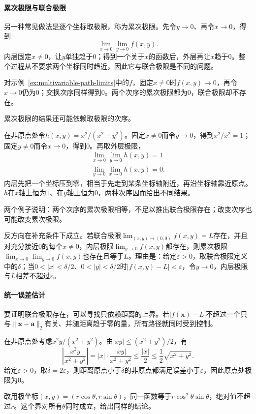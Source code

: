 \paragraph{累次极限与联合极限}
另一种常见做法是逐个坐标取极限，称为累次极限。先令$y\to0$、再令$x\to0$，得到
\[
 \lim_{x\to0}\lim_{y\to0}f(x,y).
\]
内层固定$x\neq0$，让$y$单独趋于$0$；得到一个关于$x$的函数后，外层再让$x$趋于$0$。整个过程从不要求两个坐标同时趋近，因此它与联合极限是不同的问题。

对示例~\ref{ex:multivariable-path-limits}中的$f$，固定$x\neq0$时$f(x,y)\to0$，再令$x\to0$仍为$0$；交换次序同样得到$0$。两个次序的累次极限都为$0$，联合极限却不存在。

累次极限的结果还可能依赖取极限的次序。
\begin{example}[两个次序的累次极限不相等]
\label{ex:multivariable-iterated-limits-differ}
在非原点处令$h(x,y)=x^2/(x^2+y^2)$。固定$x\neq0$而令$y\to0$，得到$x^2/x^2=1$；固定$y\neq0$而令$x\to0$，得到$0$。再取外层极限，
\[
 \begin{gathered}
\lim_{x\to0}\lim_{y\to0}h(x,y)=1\\
\lim_{y\to0}\lim_{x\to0}h(x,y)=0.
 \end{gathered}
\]
内层先把一个坐标压到零，相当于先走到某条坐标轴附近，再沿坐标轴靠近原点。$h$在$x$轴上恒为$1$、在$y$轴上恒为$0$，两种次序因而给出不同结果。
\end{example}

两个例子说明：两个次序的累次极限相等，不足以推出联合极限存在；改变次序也可能改变累次极限。

反方向在补充条件下成立。若联合极限$\lim_{(x,y)\to(0,0)}f(x,y)=L$存在，并且对充分接近$0$的每个$x\neq0$，内层极限$\lim_{y\to0}f(x,y)$都存在，则累次极限$\lim_{x\to0}\lim_{y\to0}f(x,y)$也存在且等于$L$。理由是：给定$\varepsilon>0$，取联合极限定义中的$\delta$；当$0<|x|<\delta/2$、$0<|y|<\delta/2$时$|f(x,y)-L|<\varepsilon$，令$y\to0$，内层极限与$L$相差不超过$\varepsilon$。

\paragraph{统一误差估计}
要证明联合极限存在，可以寻找只依赖距离的上界。若$|f(\bm x)-L|$不超过一个只与$\lVert\bm x-\bm a\rVert_2$有关、并随距离趋于零的量，所有路径就同时受到控制。
\begin{example}[用距离上界证明联合极限]
\label{ex:multivariable-distance-bound-limit}
在非原点处考虑$x^2y/(x^2+y^2)$。由$|xy|\leq(x^2+y^2)/2$，有
\[
 \left|\frac{x^2y}{x^2+y^2}\right|
 =|x|\cdot\frac{|xy|}{x^2+y^2}
 \leq \frac{|x|}{2}
 \leq\frac12\sqrt{x^2+y^2}.
\]
给定$\varepsilon>0$，取$\delta=2\varepsilon$，则距离原点小于$\delta$的非原点都满足误差小于$\varepsilon$，因此原点处极限为$0$。

改用极坐标$(x,y)=(r\cos\theta,r\sin\theta)$，同一函数等于$r\cos^2\theta\sin\theta$，绝对值不超过$r$。这个界对所有$\theta$同时成立，给出同样的结论。
\end{example}

